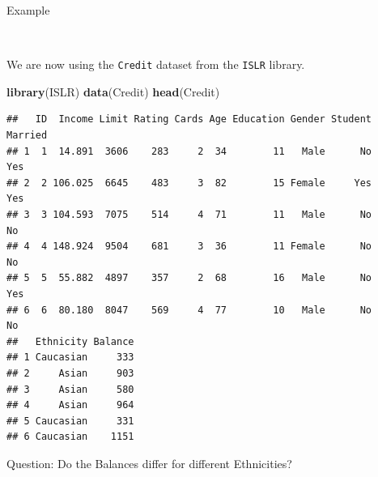 \documentclass[10pt,ignorenonframetext,]{beamer}
\newenvironment{Shaded}{\begin{snugshade}}{\end{snugshade}}
\newcommand{\KeywordTok}[1]{\textcolor[rgb]{0.13,0.29,0.53}{\textbf{#1}}}
\newcommand{\NormalTok}[1]{#1}
\begin{document}
\begin{frame}[fragile]

\begin{block}{Example}

\(~\)

We are now using the \texttt{Credit} dataset from the \texttt{ISLR}
library.

\scriptsize

\begin{Shaded}
\begin{Highlighting}[]
\KeywordTok{library}\NormalTok{(ISLR)}
\KeywordTok{data}\NormalTok{(Credit)}
\KeywordTok{head}\NormalTok{(Credit)}
\end{Highlighting}
\end{Shaded}

\begin{verbatim}
##   ID  Income Limit Rating Cards Age Education Gender Student Married
## 1  1  14.891  3606    283     2  34        11   Male      No     Yes
## 2  2 106.025  6645    483     3  82        15 Female     Yes     Yes
## 3  3 104.593  7075    514     4  71        11   Male      No      No
## 4  4 148.924  9504    681     3  36        11 Female      No      No
## 5  5  55.882  4897    357     2  68        16   Male      No     Yes
## 6  6  80.180  8047    569     4  77        10   Male      No      No
##   Ethnicity Balance
## 1 Caucasian     333
## 2     Asian     903
## 3     Asian     580
## 4     Asian     964
## 5 Caucasian     331
## 6 Caucasian    1151
\end{verbatim}

\normalsize
Question: Do the Balances differ for different Ethnicities?

\end{block}

\end{frame}
\end{document}
